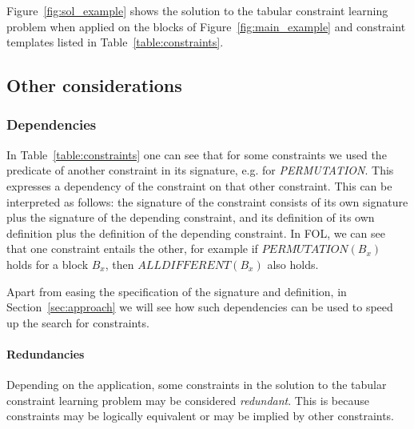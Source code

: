 \documentclass{IEEEtran}
\newcommand{\constraints}{\ensuremath{\mathcal{T}}\xspace}
\newcommand{\format}[1]{\textit{#1}\xspace}
\newcommand{\template}{\format{constraint template}}
\newcommand{\groups}{\ensuremath{\mathcal{B}}\xspace}
\newcommand{\ecalldiff}[1]{\ensuremath{\textit{ALLDIFFERENT}(#1)}}
\newcommand{\ecperm}[1]{\ensuremath{\textit{PERMUTATION}(#1)}}
\newcommand{\sg}{B}
\theoremstyle{definition}
\begin{document}

Figure~\ref{fig:sol_example} shows the solution to the tabular constraint learning problem when applied on the blocks of Figure~\ref{fig:main_example} and constraint templates listed in Table~\ref{table:constraints}.

\subsection{Other considerations}

\subsubsection{Dependencies}
\label{sec:form:dependencies}
In Table~\ref{table:constraints} one can see that for some constraints we used the predicate of another constraint in its signature, e.g. for \textit{PERMUTATION}. This expresses a dependency of the constraint on that other constraint. This can be interpreted as follows: the signature of the constraint consists of its own signature plus the signature of the depending constraint, and its definition of its own definition plus the definition of the depending constraint.
In FOL, we can see that one constraint entails the other, for example if $\ecperm{\sg_x}$ holds for a block $\sg_x$, then $\ecalldiff{\sg_{x}}$ also holds.

Apart from easing the specification of the signature and definition, in Section~\ref{sec:approach} we will see how such dependencies can be used to speed up the search for constraints.

\paragraph{Redundancies}
Depending on the application, some constraints in the solution to the tabular constraint learning problem may be considered \textit{redundant}. This is because constraints may be logically equivalent or may be implied by other constraints.
\end{document}
